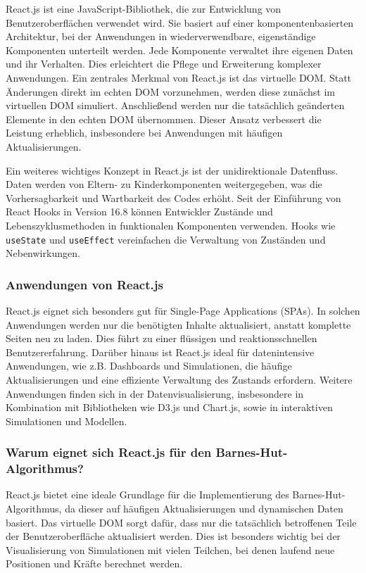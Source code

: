 \documentclass[a4paper,12pt,twoside]{article}
\begin{document}
React.js ist eine JavaScript-Bibliothek, die zur Entwicklung von Benutzeroberflächen verwendet wird. Sie basiert auf einer komponentenbasierten Architektur, bei der Anwendungen in wiederverwendbare, eigenständige Komponenten unterteilt werden. Jede Komponente verwaltet ihre eigenen Daten und ihr Verhalten. Dies erleichtert die Pflege und Erweiterung komplexer Anwendungen. Ein zentrales Merkmal von React.js ist das virtuelle DOM. Statt Änderungen direkt im echten DOM vorzunehmen, werden diese zunächst im virtuellen DOM simuliert. Anschließend werden nur die tatsächlich geänderten Elemente in den echten DOM übernommen. Dieser Ansatz verbessert die Leistung erheblich, insbesondere bei Anwendungen mit häufigen Aktualisierungen.

Ein weiteres wichtiges Konzept in React.js ist der unidirektionale Datenfluss. Daten werden von Eltern- zu Kinderkomponenten weitergegeben, was die Vorhersagbarkeit und Wartbarkeit des Codes erhöht. Seit der Einführung von React Hooks in Version 16.8 können Entwickler Zustände und Lebenszyklusmethoden in funktionalen Komponenten verwenden. Hooks wie \texttt{useState} und \texttt{useEffect} vereinfachen die Verwaltung von Zuständen und Nebenwirkungen.

\subsubsection{Anwendungen von React.js}
React.js eignet sich besonders gut für Single-Page Applications (SPAs). In solchen Anwendungen werden nur die benötigten Inhalte aktualisiert, anstatt komplette Seiten neu zu laden. Dies führt zu einer flüssigen und reaktionsschnellen Benutzererfahrung. Darüber hinaus ist React.js ideal für datenintensive Anwendungen, wie z.B. Dashboards und Simulationen, die häufige Aktualisierungen und eine effiziente Verwaltung des Zustands erfordern. Weitere Anwendungen finden sich in der Datenvisualisierung, insbesondere in Kombination mit Bibliotheken wie D3.js und Chart.js, sowie in interaktiven Simulationen und Modellen.

\subsubsection{Warum eignet sich React.js für den Barnes-Hut-Algorithmus?}
React.js bietet eine ideale Grundlage für die Implementierung des Barnes-Hut-Algorithmus, da dieser auf häufigen Aktualisierungen und dynamischen Daten basiert. Das virtuelle DOM sorgt dafür, dass nur die tatsächlich betroffenen Teile der Benutzeroberfläche aktualisiert werden. Dies ist besonders wichtig bei der Visualisierung von Simulationen mit vielen Teilchen, bei denen laufend neue Positionen und Kräfte berechnet werden.
\end{document}
